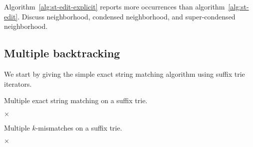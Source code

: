Algorithm~\ref{alg:st-edit-explicit} reports more occurrences than algorithm~\ref{alg:st-edit}.
Discuss neighborhood, condensed neighborhood, and super-condensed neighborhood.


\subsection{Multiple backtracking}

We start by giving the simple exact string matching algorithm using suffix trie iterators.

\begin{algorithm}[h]
\caption{Multiple exact string matching on a suffix trie.}
\label{alg:st-exact-multi}
\begin{algorithmic}[1]
		\State \Report {} $\times$ 
	\Else
		\State {}
		\Repeat
				\State {}
				\State {}
			\EndIf
	\EndIf
\EndProcedure
\end{algorithmic}
\end{algorithm}

\begin{algorithm}[h]
\caption{Multiple $k$-mismatches on a suffix trie.}
\label{alg:st-hamming-multi}
\begin{algorithmic}[1]
			\State \Report {} $\times$ 
			\Repeat
				\Repeat
					\State {}
		\EndIf
	\EndIf
\EndProcedure
\end{algorithmic}
\end{algorithm}

